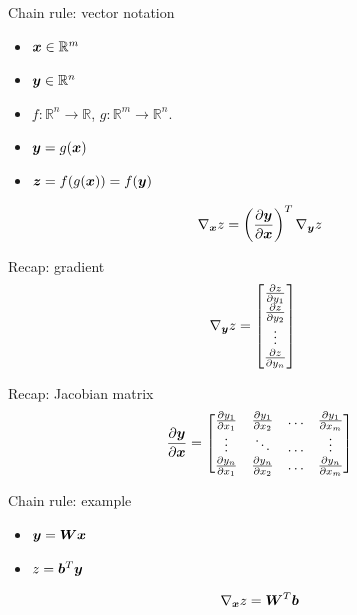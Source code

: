 \documentclass[10pt]{beamer}
\begin{document}
\begin{frame}{Chain rule: vector notation}

\Large{
\begin{itemize}
\item $\bm{x} \in \mathbb{R}^{m}$
\item $\bm{y} \in \mathbb{R}^{n}$
\item $f:\mathbb{R}^{n} \rightarrow\mathbb{R}$, $g:\mathbb{R}^{m} \rightarrow\mathbb{R}^{n}$. 
\item $\bm{y} = g(\bm{x})$
\item $\bm{z} = f(g(\bm{x})) = f(\bm{y})$
\end{itemize}
\[
\nabla_{\bm{x}} {z} = \left(\frac{\partial \bm{y}}{\partial \bm{x}}\right)^{T}\nabla_{\bm{y}} {z}
\]
}
\end{frame}

\begin{frame}{Recap: gradient}
\Large{
\begin{align*}
  \nabla_{\bm{y}} {z} &= \begin{bmatrix}
                         \frac{\partial z}{\partial y_{1}} \\
                         \frac{\partial z}{\partial y_{2}} \\
                         \vdots \\
                         \frac{\partial z}{\partial y_{n}}
                         \end{bmatrix}
\end{align*}
 }
\end{frame}

\begin{frame}{Recap: Jacobian matrix}
\Large{
\[
\frac{\partial \bm{y}}{\partial \bm{x}} =
\begin{bmatrix} 

\frac{\partial y_{1}}{\partial x_{1}} & \frac{\partial y_{1}}{\partial x_{2}} & \dots & \frac{\partial y_{1}}{\partial x_{m}} \\

\vdots & \ddots &\dots & \vdots \\

\frac{\partial y_{n}}{\partial x_{1}} &\frac{\partial y_{n}}{\partial x_{2}} & \dots&\frac{\partial y_{n}}{\partial x_{m}} 

\end{bmatrix}
\]
 }
\end{frame}

\begin{frame}{Chain rule: example}
\Large{
\begin{itemize}
\item $\bm{y} = \bm{W}\bm{x}$

\vspace{0.3cm}

\item $z = \bm{b}^{T}\bm{y}$
\end{itemize}

\vspace{0.5cm}

\[
\nabla_{\bm{x}} {z} =  \bm{W}^{T}\bm{b}
\]
}
\end{frame}
\end{document}
